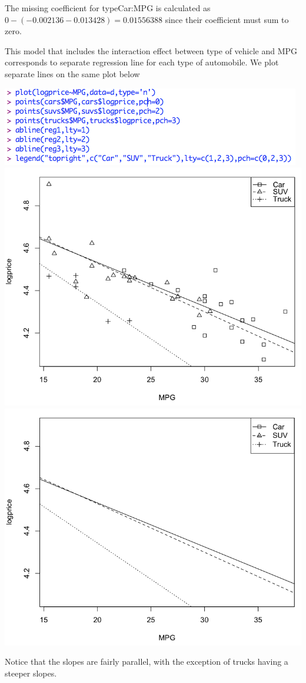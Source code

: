 \documentclass[a4 paper, 11 pt]{article}
\begin{document}
The missing coefficient for typeCar:MPG is calculated as $0-(-0.002136 - 0.013428) = 0.01556388$ since their coefficient must sum to zero.

This model that includes the interaction effect between type of vehicle and MPG corresponds to separate regression line for each type of automobile. We plot separate lines on the same plot below
\begin{center}
\includegraphics[scale=0.5]{plot} \\
\includegraphics[scale=0.3]{plot1}
\includegraphics[scale=0.3]{plot2}
\end{center}
Notice that the slopes are fairly parallel, with the exception of trucks having a steeper slopes.
\end{document}
